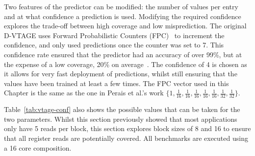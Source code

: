 Two features of the predictor can be modified: the number of values per entry and at what confidence a prediction is used.
Modifying the required confidence explores the trade-off between high coverage and low misprediction.
The original D-VTAGE uses Forward Probabilistic Counters (FPC)~\cite{riley2006fpc} to increment the confidence, and only used predictions once the counter was set to 7.
This confidence rate ensured that the predictor had an accuracy of over 99\%, but at the expense of a low coverage, 20\% on average~\cite{peraisBeBop2015}.
The confidence of 4 is chosen as it allows for very fast deployment of predictions, whilst still ensuring that the values have been trained at least a few times.
The FPC vector used in this Chapter is the same as the one in Perais et al.'s work $\{1,\frac{1}{16},\frac{1}{16},\frac{1}{16},\frac{1}{16},\frac{1}{16},\frac{1}{32},\frac{1}{32}\}$.
 




Table~\ref{tab:vtage-conf} also shows the possible values that can be taken for the two parameters.
Whilst this section previously showed that most applications only have 5 reads per block, this section explores block sizes of 8 and 16 to ensure that all register reads are potentially covered. 
All benchmarks are executed using a 16 core composition.

